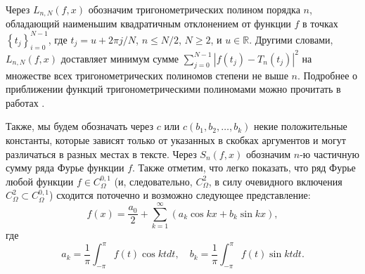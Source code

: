 Через $L_{n,N}(f,x)$ обозначим
тригонометрических полином порядка $n$, обладающий наименьшим квадратичным отклонением от функции $f$ в точках $\left\{t_{j}\right\} _{i=0}^{N-1}$,
где $t_{j}=u+2\pi j / N$, $n \leq N/2$, $N \geq 2$, и $u \in \mathbb{R}$.
Другими словами, $L_{n,N}(f,x)$ доставляет минимум сумме
$
\sum_{j=0}^{N-1}\left|f(t_{j})-T_{n}(t_{j})\right|^{2}
$
на множестве всех тригонометрических полиномов степени не выше $n$.
Подробнее о приближении функций тригонометрическими полиномами можно прочитать в работах
\cite{2_bernstein,4_erdos,7_kalashnikov,8_krilov,9_marcinkiewicz,10_marcinkiewicz,11_natanson,12_nikolsky,18_zigmund,17_turetsky}.

Также, мы будем обозначать через $c$ или $c(b_1, b_2, \ldots, b_k)$ некие положительные константы, которые зависят только от указанных в скобках аргументов и могут
различаться в разных местах в тексте.  Через $S_n(f,x)$ обозначим $n$-ю частичную сумму ряда Фурье функции $f$.
Также отметим, что легко показать, что ряд Фурье любой функции $f \in C_\Omega^{0,1}$ (и, следовательно, $C_\Omega^{2}$, в силу очевидного включения $C_\Omega^{2} \subset C_\Omega^{0,1}$)
сходится поточечно и возможно следующее представление:
\begin{equation}\label{f_as_Fourier}
	f(x) = \frac{a_0}{2} + \sum_{k=1}^{\infty} \left(a_k \cos kx + b_k \sin kx\right),
\end{equation}
где
\begin{equation}\label{akbk_definition}
	a_k = \frac1\pi \int_{-\pi}^{\pi} f(t) \cos kt dt,\quad b_k = \frac1\pi \int_{-\pi}^{\pi} f(t) \sin kt dt.
\end{equation}

